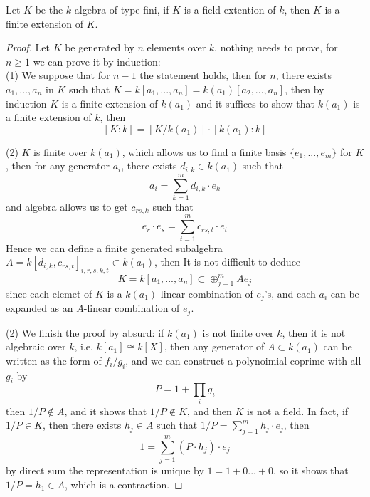 \documentclass[12pt,a4paper]{article}
\begin{document}
\begin{theorem}
    Let \(K\) be the \(k\)-algebra of type fini, if \(K\) is a field extention of \(k\), then \(K\) is a finite extension of \(K\).
 \end{theorem}
\begin{proof}
    Let \(K\) be generated by \(n\) elements over \(k\), nothing needs to prove, for \(n \geq 1\) we can prove it by induction:\\

    (1) We suppose that for \(n-1\) the statement holds, then for \(n\), there exists \(a_1,\dots,a_n\) in \(K\) such that \(K= k[a_1,...,a_n] = k(a_1)[a_2,...,a_n]\), then by induction \(K\) is a finite extension of \(k(a_1)\) and it suffices to show that \(k(a_1)\) is a finite extension of \(k\), then
    \[[K:k] = [K/k(a_1)] \cdot [k(a_1):k]\]

    (2) \(K\) is finite over \(k(a_1)\), which allows us to find a finite basis \(\{e_1,...,e_m\}\) for \(K\), then for any generator \(a_i\), there exists \(d_{i,k} \in k(a_1)\) such that
    \[a_i  = \sum_{k=1}^{m}d_{i,k}\cdot e_k\]
    and algebra allows us to get \(c_{rs,k}\) such that
    \[e_r \cdot e_s = \sum_{t=1}^m c_{rs,t} \cdot e_t\]
    Hence we can define a finite generated subalgebra \(A = k[d_{i,k},c_{rs,t}]_{i,r,s,k,t} \subset k(a_1)\), then It is not difficult to deduce
    \[K = k[a_1,...,a_n] \subset \oplus_{j=1}^m Ae_j\]
    since each elemet of \(K\) is a \(k(a_1)\)-linear combination of \(e_j\)'s, and each \(a_i\) can be expanded as an \(A\)-linear combination of \(e_j\).

    (2) We finish the proof by absurd: if \(k(a_1)\) is not finite over \(k\), then it is not algebraic over \(k\), i.e. \(k[a_1] \cong k[X]\), then any generator of \(A \subset k(a_1)\) can be written as the form of \(f_i/g_i\), and we can construct a polynoimial coprime with all \(g_i\) by
    \[P = 1 + \prod_{i}g_i\]
    then \(1/P \notin A\), and it shows that \(1/P \notin K\), and then \(K\) is not a field. In fact, if \(1/P \in K\), then there exists \(h_j \in A\) such that \(1/P = \sum_{j=1}^{m}h_j \cdot e_j\), then
    \[1 = \sum_{j=1}^m (P \cdot h_j) \cdot e_j\]
    by direct sum the representation is unique by \(1 = 1+0...+0\), so it shows that \(1/P = h_1 \in A\), which is a contraction.
    
\end{proof}
\end{document}
